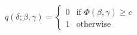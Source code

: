 \begin{equation}
  \label{eqn:chap1:kang_binarisation}
  q(\delta;\beta,\gamma) = \begin{cases}
    0 & \text{if } \Phi(\beta,\gamma) \geq c \\
    1 & \text{otherwise}
  \end{cases}
\end{equation}\\





